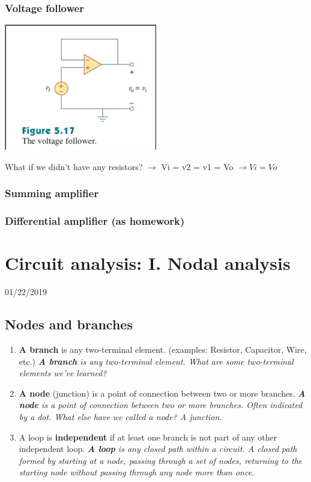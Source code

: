 \documentclass[11pt]{book}
\begin{document}
\subsection{Voltage follower}
\includegraphics[width=0.5\textwidth]{figures/op-amp5.png}

What if we didn’t have any resistors? $\rightarrow$ Vi = v2 = v1 = Vo $\rightarrow Vi = Vo$


\subsection{Summing amplifier}
\subsection{Differential amplifier (as homework)}



\chapter{Circuit analysis: I. Nodal analysis}
01/22/2019
\minitoc
\newpage
\section{Nodes and branches}
\begin{enumerate}
	\item \textbf{A branch} is any two-terminal element. (examples: Resistor, Capacitor, Wire, etc.) 
	\subitem \textit{\textbf{A branch} is any two-terminal element. What are some two-terminal elements we’ve learned?}
	\item \textbf{A node} (junction) is a point of connection between two or more branches. 
	\subitem \textit{\textbf{A node} is a point of connection between two or more branches. Often indicated by a dot. What else have we called a node? A junction.}
	\item A loop is \textbf{independent} if at least one branch is not part of any other independent loop. 
	\subitem \textit{\textbf{A loop} is any closed path within a circuit. A closed path formed by starting at a node, passing through a set of nodes, returning to the starting node without passing through any node more than once.}
\end{enumerate}
\end{document}

